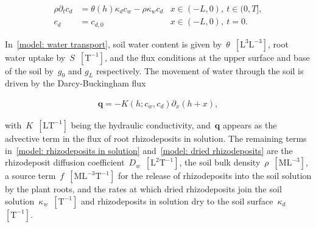 \documentclass[11pt,a4paper]{article}
\numberwithin{equation}{section}
\begin{document}
\begin{linenomath*}
	\begin{equation}\label{model: dried rhizodeposits}
		\begin{aligned}
			\rho\partial_tc_d &= \theta(h)\kappa_dc_w - \rho\kappa_wc_d &x\in(-L,0),~t\in(0, T],\\
			c_d & = c_{d, 0} &x\in(-L,0),~t=0.
		\end{aligned}
	\end{equation}
\end{linenomath*}
In~\eqref{model: water transport}, soil water content is given by~$\theta$~$[\text{L}^3\text{L}^{-3}]$, root water uptake by~$S$~$[\text{T}^{-1}]$, and the flux conditions at the upper surface and base of the soil by~$g_0$ and $g_L$ respectively. The movement of water through the soil is driven by the Darcy-Buckingham flux~\citep{darcy1856fontaines}
\begin{linenomath*}
	\begin{equation}\label{model: water flux}
		\begin{aligned}
			\mathbf{q} = - K(h; c_w, c_d)\partial_x(h + x),
		\end{aligned}
	\end{equation}
\end{linenomath*}
with~$K$~$[\text{LT}^{-1}]$ being the hydraulic conductivity, and~$\mathbf{q}$ appears as the advective term in the flux of root rhizodeposits in solution. The remaining terms in~\eqref{model: rhizodeposits in solution} and~\eqref{model: dried rhizodeposits} are the rhizodeposit diffusion coefficient~$D_w$~$[\text{L}^2\text{T}^{-1}]$, the soil bulk density~$\rho$~$[\text{ML}^{-3}]$, a source term~$f$~$[\text{ML}^{-3}\text{T}^{-1}]$ for the release of rhizodeposits into the soil solution by the plant roots, and the rates at which dried rhizodeposits join the soil solution~$\kappa_w$~$[\text{T}^{-1}]$ and rhizodeposits in solution dry to the soil surface~$\kappa_d$~$[\text{T}^{-1}]$.
 
\end{document}
